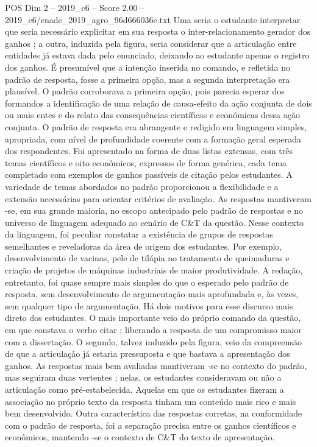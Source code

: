 \begin{textsample}{POS Dim 2 – 2019\_c6 – Score 2.00 – 2019\_c6/enade\_2019\_agro\_96d666036e.txt}
Uma seria o estudante interpretar que seria necessário explicitar em sua resposta o inter-relacionamento gerador dos ganhos ; a outra, induzida pela figura, seria considerar que a articulação entre entidades já estava dada pelo enunciado, deixando ao estudante apenas o registro dos ganhos.
É presumível que a intenção inserida no comando, e refletida no padrão de resposta, fosse a primeira opção, mas a segunda interpretação era plausível.
O padrão corroborava a primeira opção, pois parecia esperar dos formandos a identificação de uma relação de causa-efeito da ação conjunta de dois ou mais entes e do relato das consequências científicas e econômicas dessa ação conjunta.
O padrão de resposta era abrangente e redigido em linguagem simples, apropriada, com nível de profundidade coerente com a formação geral esperada dos respondentes.
Foi apresentado na forma de duas listas extensas, com três temas científicos e oito econômicos, expressos de forma genérica, cada tema completado com exemplos de ganhos passíveis de citação pelos estudantes.
A variedade de temas abordados no padrão proporcionou a flexibilidade e a extensão necessárias para orientar critérios de avaliação.
As respostas mantiveram -se, em sua grande maioria, no escopo antecipado pelo padrão de respostas e no universo de linguagem adequado ao cenário de C\&T da questão.
Nesse contexto da linguagem, foi peculiar constatar a existência de grupos de respostas semelhantes e reveladoras da área de origem dos estudantes.
Por exemplo, desenvolvimento de vacinas, pele de tilápia no tratamento de queimaduras e criação de projetos de máquinas industriais de maior produtividade.
A redação, entretanto, foi quase sempre mais simples do que o esperado pelo padrão de resposta, sem desenvolvimento de argumentação mais aprofundada e, às vezes, sem qualquer tipo de argumentação.
Há dois motivos para esse discurso mais direto dos estudantes.
O mais importante veio do próprio comando da questão, em que constava o verbo citar ; liberando a resposta de um compromisso maior com a dissertação.
O segundo, talvez induzido pela figura, veio da compreensão de que a articulação já estaria pressuposta e que bastava a apresentação dos ganhos.
As respostas mais bem avaliadas mantiveram -se no contexto do padrão, mas seguiram duas vertentes ; nelas, os estudantes consideravam ou não a articulação como pré-estabelecida.
Aquelas em que os estudantes fizeram a associação no próprio texto da resposta tinham um conteúdo mais rico e mais bem desenvolvido.
Outra característica das respostas corretas, na conformidade com o padrão de resposta, foi a separação precisa entre os ganhos científicos e econômicos, mantendo -se o contexto de C\&T do texto de apresentação.

\end{textsample}
